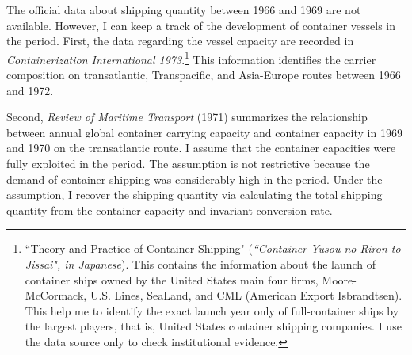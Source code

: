 The official data about shipping quantity between 1966 and 1969 are not available. However, I can keep a track of the development of container vessels in the period. First, the data regarding the vessel capacity are recorded in \textit{Containerization International 1973}.\footnote{``Theory and Practice of Container Shipping" (\textit{``Container Yusou no Riron to Jissai", in Japanese}). This contains the information about the launch of container ships owned by the United States main four firms, Moore-McCormack, U.S. Lines, SeaLand, and CML (American Export Isbrandtsen). This help me to identify the exact launch year only of full-container ships by the largest players, that is, United States container shipping companies. I use the data source only to check institutional evidence.} This information identifies the carrier composition on transatlantic, Transpacific, and Asia-Europe routes between 1966 and 1972.

Second, \textit{Review of Maritime Transport} (1971) summarizes the relationship between annual global container carrying capacity and container capacity in 1969 and 1970 on the transatlantic route. I assume that the container capacities were fully exploited in the period. The assumption is not restrictive because the demand of container shipping was considerably high in the period. Under the assumption, I recover the shipping quantity via calculating the total shipping quantity from the container capacity and invariant conversion rate.


